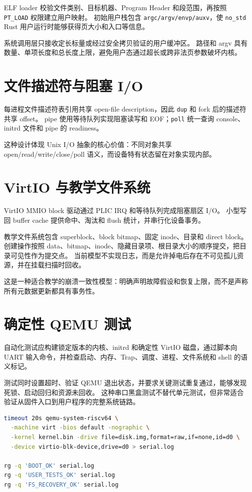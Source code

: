 ELF loader 校验文件类别、目标机器、Program Header 和段范围，再按照 \texttt{PT\_LOAD} 权限建立用户映射。
初始用户栈包含 \texttt{argc/argv/envp/auxv}，使 \texttt{no\_std} Rust 用户运行时能够获得页大小和入口等信息。

系统调用层只接收定长标量或经过安全拷贝验证的用户缓冲区。
路径和 argv 具有数量、单项长度和总长度上限，避免用户态通过超长或跨非法页参数破坏内核。

\section{文件描述符与阻塞 I/O}

每进程文件描述符表引用共享 open-file description，因此 \texttt{dup} 和 fork 后的描述符共享 offset。
pipe 使用等待队列实现阻塞读写和 EOF；\texttt{poll} 统一查询 console、initrd 文件和 pipe 的 readiness。

这种设计体现 Unix I/O 抽象的核心价值：不同对象共享 open/read/write/close/poll 语义，而设备特有状态留在对象实现内部。

\section{VirtIO 与教学文件系统}

VirtIO MMIO block 驱动通过 PLIC IRQ 和等待队列完成阻塞扇区 I/O。
小型写回 buffer cache 提供命中、淘汰和 flush 统计，并串行化设备事务。

教学文件系统包含 superblock、block bitmap、固定 inode、目录和 direct block。
创建操作按照 data、bitmap、inode、隐藏目录项、根目录大小的顺序提交，把目录可见性作为提交点。
当前模型不实现日志，而是允许掉电后存在不可见孤儿资源，并在挂载扫描时回收。

这是一种适合教学的崩溃一致性模型：明确声明故障假设和恢复上限，而不是声称所有元数据更新都具有事务性。

\section{确定性 QEMU 测试}

自动化测试应构建锁定版本的内核、initrd 和确定性 VirtIO 磁盘，通过脚本向 UART 输入命令，并检查启动、内存、Trap、调度、进程、文件系统和 shell 的语义标记。

测试同时设置超时、验证 QEMU 退出状态，并要求关键测试重复通过，能够发现死锁、启动回归和资源未回收。
这种串口黑盒测试不替代单元测试，但非常适合验证从固件入口到用户程序的完整系统链路。

\begin{lstlisting}[language=bash,caption={QEMU 串口冒烟测试的最小闭环（伪代码）}]
timeout 20s qemu-system-riscv64 \
  -machine virt -bios default -nographic \
  -kernel kernel.bin -drive file=disk.img,format=raw,if=none,id=d0 \
  -device virtio-blk-device,drive=d0 > serial.log

rg -q 'BOOT_OK' serial.log
rg -q 'USER_TESTS_OK' serial.log
rg -q 'FS_RECOVERY_OK' serial.log
\end{lstlisting}

